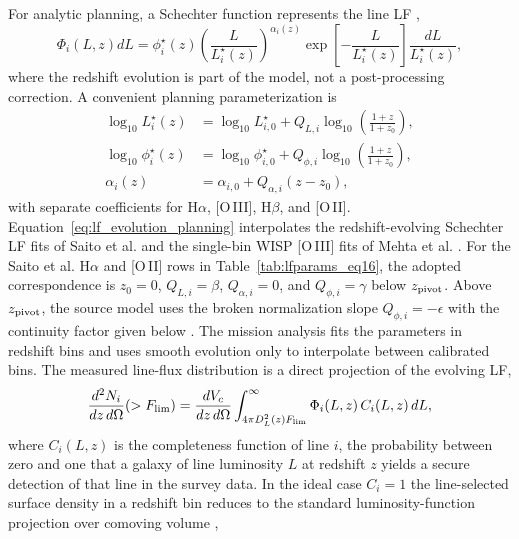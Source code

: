 For analytic planning, a Schechter function represents the line LF \cite{schechter1976,saito2020,mehta2015},
\begin{equation}
  \Phi_i(L,z)dL =
  \phi_i^\star(z)
  \left(\frac{L}{L_i^\star(z)}\right)^{\alpha_i(z)}
  \exp\!\left[-\frac{L}{L_i^\star(z)}\right]
  \frac{dL}{L_i^\star(z)} ,
\end{equation}
where the redshift evolution is part of the model, not a post-processing correction. A convenient planning parameterization is
\begin{equation}
  \begin{aligned}
  \log_{10}L_i^\star(z) &=
  \log_{10}L_{i,0}^\star+
  Q_{L,i}\log_{10}\!\left(\frac{1+z}{1+z_0}\right),\\
  \log_{10}\phi_i^\star(z) &=
  \log_{10}\phi_{i,0}^\star+
  Q_{\phi,i}\log_{10}\!\left(\frac{1+z}{1+z_0}\right),\\
  \alpha_i(z) &= \alpha_{i,0}+Q_{\alpha,i}(z-z_0),
  \end{aligned}
  \label{eq:lf_evolution_planning}
\end{equation}
with separate coefficients for H$\alpha$, [O\,III], H$\beta$, and [O\,II]. Equation~\eqref{eq:lf_evolution_planning} interpolates the redshift-evolving Schechter LF fits of Saito et al. \cite{saito2020} and the single-bin WISP [O\,III] fits of Mehta et al. \cite{mehta2015}. For the Saito et al. H$\alpha$ and [O\,II] rows in Table~\ref{tab:lfparams_eq16}, the adopted correspondence is $z_0=0$, $Q_{L,i}=\beta$, $Q_{\alpha,i}=0$, and $Q_{\phi,i}=\gamma$ below $z_{\rm pivot}$. Above $z_{\rm pivot}$, the source model uses the broken normalization slope $Q_{\phi,i}=-\epsilon$ with the continuity factor given below \cite{saito2020}. The mission analysis fits the parameters in redshift bins and uses smooth evolution only to interpolate between calibrated bins. The measured line-flux distribution is a direct projection of the evolving LF,
\begin{equation}
  \frac{d^2N_i}{dz\,d\Omega}(>F_{\rm lim}) =
  \frac{dV_c}{dz\,d\Omega}
  \int_{4\pi D_L^2(z)F_{\rm lim}}^\infty
  \Phi_i(L,z)\,C_i(L,z)\,dL ,
\end{equation}
where $C_i(L,z)$ is the completeness function of line $i$, the probability between zero and one that a galaxy of line luminosity $L$ at redshift $z$ yields a secure detection of that line in the survey data. In the ideal case $C_i=1$ the line-selected surface density in a redshift bin reduces to the standard luminosity-function projection over comoving volume \cite{schechter1976,saito2020,mehta2015},
